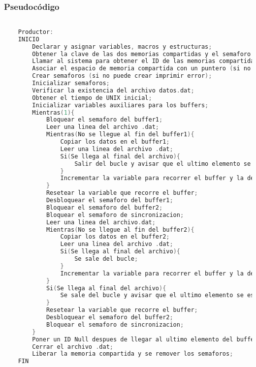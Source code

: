 \subsubsection{Pseudocódigo}

\begin{lstlisting}[language=C]          % No usar tildes en el pseudocódigo y dejar una linea vacía al principio y al final

    Productor:
    INICIO
        Declarar y asignar variables, macros y estructuras;
        Obtener la clave de las dos memorias compartidas y el semaforo (en el caso de no obtenerlas imprimir error);
        Llamar al sistema para obtener el ID de las memorias compartidas (en el caso de que no obtenerlas imprimir error);
        Asociar el espacio de memoria compartida con un puntero (si no puede asociar imprimir error);
        Crear semaforos (si no puede crear imprimir error);
        Inicializar semaforos;
        Verificar la existencia del archivo datos.dat;
        Obtener el tiempo de UNIX inicial;
        Inicializar variables auxiliares para los buffers;
        Mientras(1){
	        Bloquear el semaforo del buffer1;
	        Leer una linea del archivo .dat;
	        Mientras(No se llegue al fin del buffer1){
		        Copiar los datos en el buffer1;
		        Leer una linea del archivo .dat;
		        Si(Se llega al final del archivo){
			        Salir del bucle y avisar que el ultimo elemento se escribio en el buffer1;
                }
                Incrementar la variable para recorrer el buffer y la del id;
	        }
            Resetear la variable que recorre el buffer;
            Desbloquear el semaforo del buffer1;
            Bloquear el semaforo del buffer2;
            Bloquear el semaforo de sincronizacion;
            Leer una linea del archivo.dat;
            Mientras(No se llegue al fin del buffer2){
		        Copiar los datos en el buffer2;
		        Leer una linea del archivo .dat;
		        Si(Se llega al final del archivo){
			        Se sale del bucle;
                }
                Incrementar la variable para recorrer el buffer y la del ID;
            }
            Si(Se llega al final del archivo){
        	    Se sale del bucle y avisar que el ultimo elemento se escribio en el buffer2;
            }
            Resetear la variable que recorre el buffer;
            Desbloquear el semaforo del buffer2;
            Bloquear el semaforo de sincronizacion;
        }
        Poner un ID Null despues de llegar al ultimo elemento del buffer correspondiente para avisarle al consumidor que se llego al EOF;
        Cerrar el archivo .dat;
        Liberar la memoria compartida y se remover los semaforos;
    FIN


\end{lstlisting}
